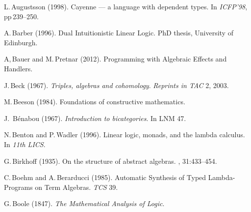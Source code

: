 \documentclass[11pt,twocolumn]{article}
\begin{document}
{\begin{thebibliography}{000}

L.\,Augustsson (1998).
\newblock Cayenne --- a language with dependent types.
\newblock In \emph{ICFP'98}, pp\,239--250.

A.\,Barber (1996).
\newblock Dual Intuitionistic Linear Logic. 
\newblock PhD thesis, University of Edinburgh. 

A,\,Bauer and M.\,Pretnar (2012).
\newblock Programming with Algebraic Effects and Handlers.

J.\,Beck (1967).
\newblock \emph{Triples, algebras and cohomology}.
\newblock \emph{Reprints in TAC} 2, 2003. 


M.\,Beeson (1984).
\newblock Foundations of constructive mathematics.


J.~B{\'e}nabou (1967). 
\newblock \emph{Introduction to bicategories}. 
\newblock In LNM 47.

N.\,Benton and P.\,Wadler (1996). 
\newblock Linear logic, monads, and the lambda calculus.
\newblock In \emph{11th LICS}.

G.\,Birkhoff (1935).
\newblock On the structure of abstract algebras.
, 31:433--454. 
  
C.\,Boehm and A.\,Berarducci (1985). 
\newblock Automatic Synthesis of Typed Lambda-Programs on Term Algebras.
\newblock \emph{TCS} 39.

G.\,Boole (1847).
\newblock \emph{The Mathematical Analysis of Logic}.%


\end{thebibliography}}
\end{document}

